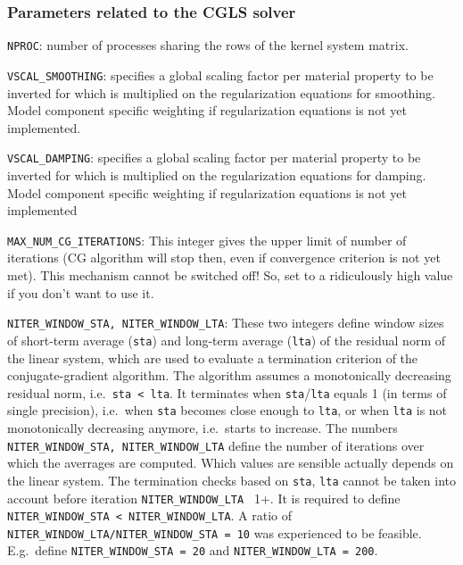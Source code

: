 \subsubsection{Parameters related to the CGLS solver}
\begin{description}
\setlength{\itemsep}{-0.0cm}
\item \verb+NPROC+: number of processes sharing the rows of the kernel system matrix.
\item
\verb+VSCAL_SMOOTHING+: specifies a global scaling factor per material property to be inverted for which is multiplied on the regularization equations for smoothing. Model component specific weighting if regularization equations is not yet implemented.
\item
\verb+VSCAL_DAMPING+: specifies a global scaling factor per material property to be inverted for which is multiplied on the regularization equations for damping. Model component specific weighting if regularization equations is not yet implemented
\item
\verb+MAX_NUM_CG_ITERATIONS+: This integer gives the upper limit of number of iterations (CG algorithm will stop then, even if convergence criterion is not yet met). This mechanism cannot be switched off! So, set to a ridiculously high value if you don't want to use it.
\item
\verb+NITER_WINDOW_STA, NITER_WINDOW_LTA+: These two integers define window sizes of short-term average (\verb+sta+) and long-term average (\verb+lta+) of the residual norm of the linear system, which are used to evaluate a termination criterion of the conjugate-gradient algorithm. The algorithm assumes a monotonically decreasing residual norm, i.e.\ \verb+sta < lta+. It terminates when \verb+sta+/\verb+lta+ equals 1 (in terms of single precision), i.e.\ when \verb+sta+ becomes close enough to \verb+lta+, or when \verb+lta+ is not monotonically decreasing anymore, i.e.\ starts to increase.
The numbers \verb+NITER_WINDOW_STA, NITER_WINDOW_LTA+ define the number of iterations over which the averrages are computed. Which values are sensible actually depends on the linear system. The termination checks based on \verb+sta+, \verb+lta+ cannot be taken into account before iteration
\verb+NITER_WINDOW_LTA + 1+. It is required to define \verb+NITER_WINDOW_STA < NITER_WINDOW_LTA+.
A ratio of \verb+NITER_WINDOW_LTA/NITER_WINDOW_STA = 10+ was experienced to be feasible. E.g.\ define \verb+NITER_WINDOW_STA = 20+ and \verb+NITER_WINDOW_LTA = 200+.
\end{description}
%
